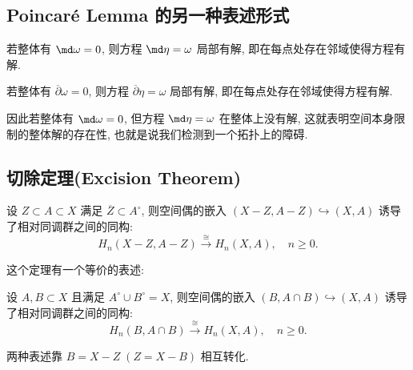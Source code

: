     \subsection[Poincar\'e Lemma]{Poincar\'e Lemma 的另一种表述形式}
        \begin{lemma}
            若整体有 $\md\omega = 0$, 
            则方程 $\md\eta=\omega$ 局部有解, 
            即在每点处存在邻域使得方程有解.
        \end{lemma}
        \begin{lemma}
            若整体有 $\overline{\partial}\omega = 0$, 
            则方程 $\overline{\partial}\eta=\omega$ 局部有解, 
            即在每点处存在邻域使得方程有解.
        \end{lemma}
        \begin{remark}
            因此若整体有 $\md\omega = 0$, 
            但方程 $\md\eta=\omega$ 在整体上没有解, 
            这就表明空间本身限制的整体解的存在性, 
            也就是说我们检测到一个拓扑上的障碍.
        \end{remark}

    \subsection[Excision Theorem in Signular Homology]{切除定理(Excision Theorem)}
        \begin{theorem}[切除定理表述1]\label{thm:excision-1}
            设 $Z\subset A\subset X$ 满足 $\overline{Z}\subset A^{\circ}$, 
            则空间偶的嵌入 $(X-Z,A-Z)\hookrightarrow(X,A)$ 
            诱导了相对同调群之间的同构:
            \begin{equation*}
                H_n(X-Z,A-Z)\overset{\cong}{\longrightarrow} H_n(X,A),\quad n\geq0.
            \end{equation*}
        \end{theorem}
        这个定理有一个等价的表述:
        \begin{theorem}[切除定理表述2]\label{thm:excision-2}
            设 $A,B\subset X$ 且满足 $A^{\circ}\cup B^{\circ}=X$, 
            则空间偶的嵌入 $(B,A\cap B)\hookrightarrow(X,A)$ 
            诱导了相对同调群之间的同构:
            \begin{equation*}
                H_n(B,A\cap B)\overset{\cong}{\longrightarrow} 
                H_n(X,A),\quad n\geq0.
            \end{equation*}
        \end{theorem}
        \begin{remark}
            两种表述靠 $B=X-Z\;(Z=X-B)$ 相互转化.
        \end{remark}

